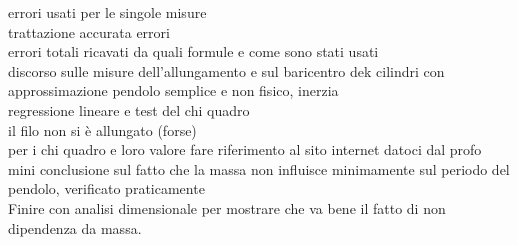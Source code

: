 errori usati per le singole misure\\
trattazione accurata errori\\
errori totali ricavati da quali formule e come sono stati usati\\
discorso sulle misure dell'allungamento e sul baricentro dek cilindri con approssimazione pendolo semplice e non fisico, inerzia\\
regressione lineare e test del chi quadro\\
il filo non si è allungato (forse)\\
per i chi quadro e loro valore fare riferimento al sito internet datoci dal profo\\
mini conclusione sul fatto che la massa non influisce minimamente sul periodo del pendolo, verificato praticamente\\
Finire con analisi dimensionale per mostrare che va bene il fatto di non dipendenza da massa.\\